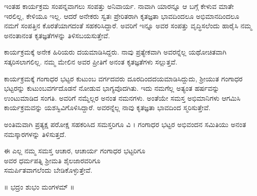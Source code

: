 {ಇಂತಹ ಕಾರ್ಯಕ್ರಮ ಸಂಪನ್ನವಾಗಲು ಸಂಪತ್ತು ಅನಿವಾರ್ಯ. ನಾವಾಗಿ ಯಾರನ್ನೂ ಆ ಬಗ್ಗೆ ಕೇಳುವ ಮಾತೇ ಇರಲಿಲ್ಲ, ಕೇಳಿಯೂ ಇಲ್ಲ. ಆದರೆ ಅನೇಕರು ಸ್ವತಃ ಪ್ರೇರಿತರಾಗಿ ಕೃತಜ್ಞತಾ ಭಾವದಿಂದಲೂ ಅಭಿಮಾನದಿಂದಲೂ ನಮಗೆ ಸಂಪತ್ತಿನ ಕೊರತೆಯಾಗದಂತೆ ಸಹಕರಿಸಿದ್ದಾರೆ. ಅವರಿಗೆ ಇನ್ನೂ ಅವರ ಸಂಪತ್ತು ವೃದ್ಧಿಸಲೆಂದು ಹಾರೈಸಿ ನಮ್ಮ ಅನಂತಾನಂತ ಕೃತಜ್ಞತೆಗಳನ್ನು ತಿಳಿಸಬಯಸುತ್ತೇವೆ.

ಕಾರ್ಯಕ್ರಮಕ್ಕೆ ಅನೇಕ ಹಿರಿಯರು ದಯಮಾಡಿಸಿದ್ದರು. ನಾವು ಪ್ರತ್ಯೇಕವಾಗಿ ಅವರನ್ನೆಲ್ಲ ಯಥೋಚಿತವಾಗಿ ಸತ್ಕರಿಸಲಾಗಲಿಲ್ಲ. ನಮ್ಮ ಮೇಲಿನ ಅವರ ಪ್ರೀತಿಗೆ ಅನಂತ ಕೃತಜ್ಞತೆಗಳು ಸಲ್ಲುತ್ತವೆ. 

ಕಾರ್ಯಕ್ರಮಕ್ಕೆ ಗಂಗಾಧರ ಭಟ್ಟರ ಕುಟುಂಬ ವರ್ಗದವರು ದೂರದಿಂದ\break ದಯಮಾಡಿಸಿದ್ದುದು, ಶ್ರೀಯುತ ಗಂಗಾಧರ ಭಟ್ಟರನ್ನು  ಕುಟುಂಬವರ್ಗದೊಡನೆ ನೋಡುವ ಭಾಗ್ಯವೊದಗಿತು. ಇದು ನಮಗೆಲ್ಲ ಅತ್ಯಂತ ಹರ್ಷವನ್ನು ಉಂಟುಮಾಡಿದ ಸಂಗತಿ. ಅವರಿಗೆ ನಮ್ಮೆಲ್ಲರ ಅನಂತ ನಮನಗಳು. ಅಂತೆಯೇ ಸಮಸ್ತ ಅಭಿಮಾನಿಗಳು ಆಗಮಿಸಿ ಕಾರ್ಯಕ್ರಮವನ್ನು ಯಶಸ್ವಿವಿಗೊಳಿಸಿದ್ದಾರೆ. ಅವರನ್ನೆಲ್ಲ ನಾವು ಕೃತಜ್ಞತಾ ಭಾವದಿಂದ ಸ್ಮರಿಸುತ್ತೇವೆ.  

ಅಂತಿಮವಾಗಿ ಪ್ರತ್ಯಕ್ಷ ಪರೋಕ್ಷ ಸಹಕರಿಸಿದ ಸಮಸ್ತರಿಗೂ ವಿ । ಗಂಗಾಧರ ಭಟ್ಟರ ಅಭಿವಂದನ ಸಮಿತಿಯು ಅನಂತ ನಮಸ್ಕಾರಗಳನ್ನು ತಿಳಿಸುತ್ತದೆ.

\begin{center}
ಈ ಎಲ್ಲ ನಮ್ಮ ಸಮಸ್ತ ಆಚಾರ,  ಆಚಾರ್ಯ ಗಂಗಾಧರ ಭಟ್ಟರಿಗೂ\\ ಅವರ ಧರ್ಮಪತ್ನಿ ಶ್ರೀಮತಿ ಶೈಲಜಾರವರಿಗೂ\\ ಸಮರ್ಪಿತವಾಗಲೆಂದು ಬೇಡಿಕೊಳ್ಳುತ್ತೇವೆ.
\medskip

॥ ಭದ್ರಂ ಶುಭಂ ಮಂಗಳಮ್ ॥
\end{center}

\articleend
}

 

